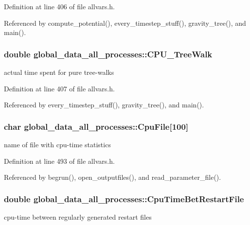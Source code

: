 Definition at line 406 of file allvars.h.



Referenced by compute\_\-potential(), every\_\-timestep\_\-stuff(), gravity\_\-tree(), and main().

\hypertarget{structglobal__data__all__processes_acf5e983357d7be116cd6663958e5a149}{
\subsubsection[{CPU\_\-TreeWalk}]{\setlength{\rightskip}{0pt plus 5cm}double {\bf global\_\-data\_\-all\_\-processes::CPU\_\-TreeWalk}}}
\label{structglobal__data__all__processes_acf5e983357d7be116cd6663958e5a149}
actual time spent for pure tree-\/walks 

Definition at line 407 of file allvars.h.



Referenced by every\_\-timestep\_\-stuff(), gravity\_\-tree(), and main().

\hypertarget{structglobal__data__all__processes_ac2ba980c60460b89534ca8bba63cd679}{
\subsubsection[{CpuFile}]{\setlength{\rightskip}{0pt plus 5cm}char {\bf global\_\-data\_\-all\_\-processes::CpuFile}\mbox{[}100\mbox{]}}}
\label{structglobal__data__all__processes_ac2ba980c60460b89534ca8bba63cd679}
name of file with cpu-\/time statistics 

Definition at line 493 of file allvars.h.



Referenced by begrun(), open\_\-outputfiles(), and read\_\-parameter\_\-file().

\hypertarget{structglobal__data__all__processes_af087b459cc41cb6b81bdbdd0e339cb6f}{
\subsubsection[{CpuTimeBetRestartFile}]{\setlength{\rightskip}{0pt plus 5cm}double {\bf global\_\-data\_\-all\_\-processes::CpuTimeBetRestartFile}}}
\label{structglobal__data__all__processes_af087b459cc41cb6b81bdbdd0e339cb6f}
cpu-\/time between regularly generated restart files 

